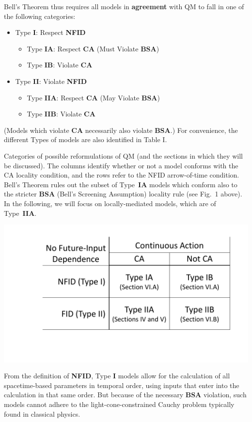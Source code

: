 \documentclass[onecolumn, nofootinbib, 12pt]{revtex4-1}
\begin{document}
Bell's Theorem thus requires all models in {\bf agreement} with QM to fall in one of the following categories:
\begin{itemize}
\item Type {\bf I}: Respect {\bf NFID}
    \begin{itemize}
    \item Type {\bf IA}: Respect {\bf CA} (Must Violate {\bf BSA})
    \item Type {\bf IB}: Violate {\bf CA}
    \end{itemize}
\item Type {\bf II}: Violate {\bf NFID}
    \begin{itemize}
    \item Type {\bf IIA}: Respect {\bf CA} (May Violate {\bf BSA})
    \item Type {\bf IIB}: Violate {\bf CA}
    \end{itemize}
\end{itemize}
(Models which violate {\bf CA} necessarily also violate {\bf BSA}.)  For convenience, the different Types of models are also identified in Table I.

\begin{table}[b]%
\label{Table:Types}
\caption{Categories of possible reformulations of QM (and the sections in which they will be discussed).  The columns identify whether or not a model conforms with the CA locality condition, and the rows refer to the NFID arrow-of-time condition.  Bell's Theorem rules out the subset of Type~{\bf IA} models which conform also to the stricter {\bf BSA} (Bell's Screening Assumption) locality rule (see Fig.~1 above).  In the following, we will focus on locally-mediated models, which are of Type~{\bf IIA}.}
\centerline{\includegraphics[width=.7\textwidth]{TypeTable.pdf}}
\end{table}


From the definition of {\bf NFID}, Type {\bf I} models allow for the calculation of all spacetime-based parameters in temporal order, using inputs that enter into the calculation in that same order.  But because of the necessary {\bf BSA} violation, such models cannot adhere to the light-cone-constrained Cauchy problem typically found in classical physics.  
\end{document}
